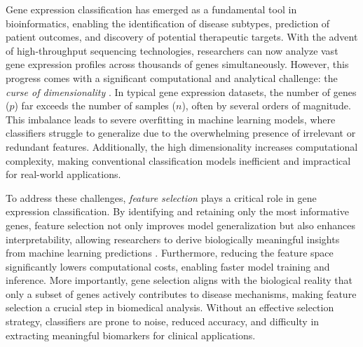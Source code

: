 Gene expression classification \cite{ahmed2019gene,huynh2018random,do2024enhancing,do2023ensemble,huynh2019novel} has emerged as a fundamental tool in bioinformatics, enabling the identification of disease subtypes, prediction of patient outcomes, and discovery of potential therapeutic targets. With the advent of high-throughput sequencing technologies, researchers can now analyze vast gene expression profiles across thousands of genes simultaneously. However, this progress comes with a significant computational and analytical challenge: the \textit{curse of dimensionality} \cite{koppen2000curse,bach2017breaking}. In typical gene expression datasets, the number of genes (\( p \)) far exceeds the number of samples (\( n \)), often by several orders of magnitude. This imbalance leads to severe overfitting in machine learning models, where classifiers struggle to generalize due to the overwhelming presence of irrelevant or redundant features. Additionally, the high dimensionality increases computational complexity, making conventional classification models inefficient and impractical for real-world applications.

To address these challenges, \textit{feature selection} \cite{li2017feature,miao2016survey} plays a critical role in gene expression classification. By identifying and retaining only the most informative genes, feature selection not only improves model generalization but also enhances interpretability, allowing researchers to derive biologically meaningful insights from machine learning predictions \cite{do2024enhancing,karim2019onconetexplainer}. Furthermore, reducing the feature space significantly lowers computational costs, enabling faster model training and inference. More importantly, gene selection aligns with the biological reality that only a subset of genes actively contributes to disease mechanisms, making feature selection a crucial step in biomedical analysis. Without an effective selection strategy, classifiers are prone to noise, reduced accuracy, and difficulty in extracting meaningful biomarkers for clinical applications.

